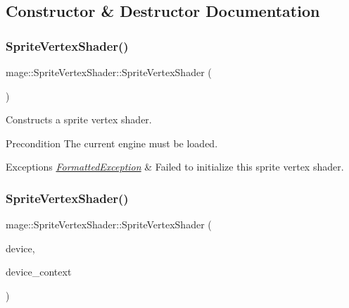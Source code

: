 \subsection{Constructor \& Destructor Documentation}
\hypertarget{classmage_1_1_sprite_vertex_shader_a2c9628875d3ab758df9f077d5275b08c}{}\label{classmage_1_1_sprite_vertex_shader_a2c9628875d3ab758df9f077d5275b08c} 
\subsubsection{\texorpdfstring{Sprite\+Vertex\+Shader()}{SpriteVertexShader()}\hspace{0.1cm}{\footnotesize\ttfamily [1/4]}}
{\footnotesize\ttfamily mage\+::\+Sprite\+Vertex\+Shader\+::\+Sprite\+Vertex\+Shader (\begin{DoxyParamCaption}{ }\end{DoxyParamCaption})}

Constructs a sprite vertex shader.

\begin{DoxyPrecond}{Precondition}
The current engine must be loaded. 
\end{DoxyPrecond}

\begin{DoxyExceptions}{Exceptions}
{\em \hyperlink{structmage_1_1_formatted_exception}{Formatted\+Exception}} & Failed to initialize this sprite vertex shader. \\
\hline
\end{DoxyExceptions}
\hypertarget{classmage_1_1_sprite_vertex_shader_a57f08ac16ace6190281fb4fa413c1b9e}{}\label{classmage_1_1_sprite_vertex_shader_a57f08ac16ace6190281fb4fa413c1b9e} 
\subsubsection{\texorpdfstring{Sprite\+Vertex\+Shader()}{SpriteVertexShader()}\hspace{0.1cm}{\footnotesize\ttfamily [2/4]}}
{\footnotesize\ttfamily mage\+::\+Sprite\+Vertex\+Shader\+::\+Sprite\+Vertex\+Shader (\begin{DoxyParamCaption}\item[{I\+D3\+D11\+Device2 $\ast$}]{device,  }\item[{I\+D3\+D11\+Device\+Context2 $\ast$}]{device\+\_\+context }\end{DoxyParamCaption})\hspace{0.3cm}{\ttfamily [explicit]}}

